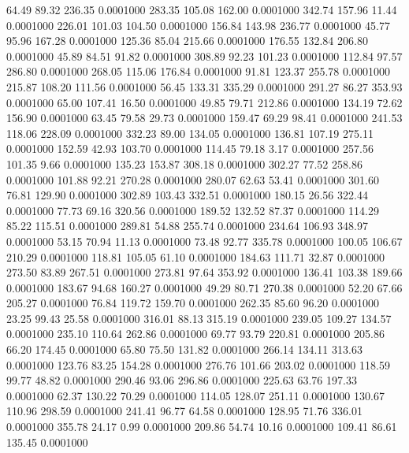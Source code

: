   64.49   89.32  236.35   0.0001000
 283.35  105.08  162.00   0.0001000
 342.74  157.96   11.44   0.0001000
 226.01  101.03  104.50   0.0001000
 156.84  143.98  236.77   0.0001000
  45.77   95.96  167.28   0.0001000
 125.36   85.04  215.66   0.0001000
 176.55  132.84  206.80   0.0001000
  45.89   84.51   91.82   0.0001000
 308.89   92.23  101.23   0.0001000
 112.84   97.57  286.80   0.0001000
 268.05  115.06  176.84   0.0001000
  91.81  123.37  255.78   0.0001000
 215.87  108.20  111.56   0.0001000
  56.45  133.31  335.29   0.0001000
 291.27   86.27  353.93   0.0001000
  65.00  107.41   16.50   0.0001000
  49.85   79.71  212.86   0.0001000
 134.19   72.62  156.90   0.0001000
  63.45   79.58   29.73   0.0001000
 159.47   69.29   98.41   0.0001000
 241.53  118.06  228.09   0.0001000
 332.23   89.00  134.05   0.0001000
 136.81  107.19  275.11   0.0001000
 152.59   42.93  103.70   0.0001000
 114.45   79.18    3.17   0.0001000
 257.56  101.35    9.66   0.0001000
 135.23  153.87  308.18   0.0001000
 302.27   77.52  258.86   0.0001000
 101.88   92.21  270.28   0.0001000
 280.07   62.63   53.41   0.0001000
 301.60   76.81  129.90   0.0001000
 302.89  103.43  332.51   0.0001000
 180.15   26.56  322.44   0.0001000
  77.73   69.16  320.56   0.0001000
 189.52  132.52   87.37   0.0001000
 114.29   85.22  115.51   0.0001000
 289.81   54.88  255.74   0.0001000
 234.64  106.93  348.97   0.0001000
  53.15   70.94   11.13   0.0001000
  73.48   92.77  335.78   0.0001000
 100.05  106.67  210.29   0.0001000
 118.81  105.05   61.10   0.0001000
 184.63  111.71   32.87   0.0001000
 273.50   83.89  267.51   0.0001000
 273.81   97.64  353.92   0.0001000
 136.41  103.38  189.66   0.0001000
 183.67   94.68  160.27   0.0001000
  49.29   80.71  270.38   0.0001000
  52.20   67.66  205.27   0.0001000
  76.84  119.72  159.70   0.0001000
 262.35   85.60   96.20   0.0001000
  23.25   99.43   25.58   0.0001000
 316.01   88.13  315.19   0.0001000
 239.05  109.27  134.57   0.0001000
 235.10  110.64  262.86   0.0001000
  69.77   93.79  220.81   0.0001000
 205.86   66.20  174.45   0.0001000
  65.80   75.50  131.82   0.0001000
 266.14  134.11  313.63   0.0001000
 123.76   83.25  154.28   0.0001000
 276.76  101.66  203.02   0.0001000
 118.59   99.77   48.82   0.0001000
 290.46   93.06  296.86   0.0001000
 225.63   63.76  197.33   0.0001000
  62.37  130.22   70.29   0.0001000
 114.05  128.07  251.11   0.0001000
 130.67  110.96  298.59   0.0001000
 241.41   96.77   64.58   0.0001000
 128.95   71.76  336.01   0.0001000
 355.78   24.17    0.99   0.0001000
 209.86   54.74   10.16   0.0001000
 109.41   86.61  135.45   0.0001000
